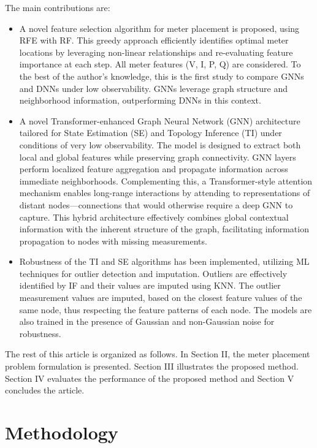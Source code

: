 \documentclass[journal]{IEEEtran}  %
\begin{document}
The main contributions are:

\begin{itemize}

  \item A novel feature selection algorithm for meter placement is proposed, using RFE with RF. This greedy approach efficiently identifies optimal meter locations by leveraging non-linear relationships and re-evaluating feature importance at each step. All meter features (V, I, P, Q) are considered. To the best of the author’s knowledge, this is the first study to compare GNNs and DNNs under low observability. GNNs leverage graph structure and neighborhood information, outperforming DNNs in this context.

  \item A novel Transformer-enhanced Graph Neural Network (GNN) architecture tailored for State Estimation (SE) and Topology Inference (TI) under conditions of very low observability. The model is designed to extract both local and global features while preserving graph connectivity. GNN layers perform localized feature aggregation and propagate information across immediate neighborhoods. Complementing this, a Transformer-style attention mechanism enables long-range interactions by attending to representations of distant nodes—connections that would otherwise require a deep GNN to capture. This hybrid architecture effectively combines global contextual information with the inherent structure of the graph, facilitating information propagation to nodes with missing measurements.

  \item Robustness of the TI and SE algorithms has been implemented, utilizing ML techniques for outlier detection and imputation. Outliers are effectively identified by IF and their values are imputed using KNN. The outlier measurement values are imputed, based on the closest feature values of the same node, thus respecting the feature patterns of each node. The models are also trained in the presence of Gaussian and non-Gaussian noise for robustness.

\end{itemize}

The rest of this article is organized as follows. In Section II, the meter placement problem formulation is presented. Section III illustrates the proposed method. Section IV evaluates the performance of the proposed method and Section V concludes the article.


\section{Methodology}
\end{document}
